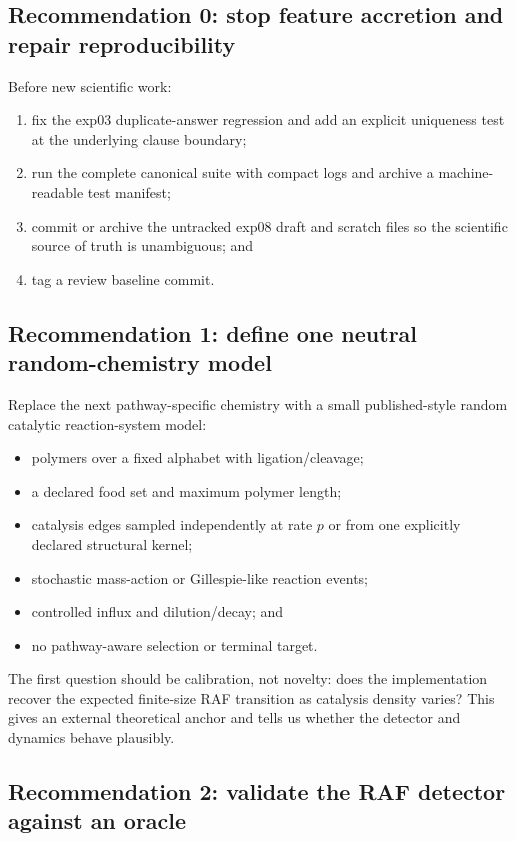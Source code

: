 \documentclass[11pt]{article}
\begin{document}
\subsection{Recommendation 0: stop feature accretion and repair reproducibility}

Before new scientific work:

\begin{enumerate}
\item fix the exp03 duplicate-answer regression and add an explicit uniqueness
      test at the underlying clause boundary;
\item run the complete canonical suite with compact logs and archive a
      machine-readable test manifest;
\item commit or archive the untracked exp08 draft and scratch files so the
      scientific source of truth is unambiguous; and
\item tag a review baseline commit.
\end{enumerate}

\subsection{Recommendation 1: define one neutral random-chemistry model}

Replace the next pathway-specific chemistry with a small published-style random
catalytic reaction-system model:

\begin{itemize}
\item polymers over a fixed alphabet with ligation/cleavage;
\item a declared food set and maximum polymer length;
\item catalysis edges sampled independently at rate $p$ or from one explicitly
  declared structural kernel;
\item stochastic mass-action or Gillespie-like reaction events;
\item controlled influx and dilution/decay; and
\item no pathway-aware selection or terminal target.
\end{itemize}

The first question should be calibration, not novelty: does the implementation
recover the expected finite-size RAF transition as catalysis density varies?
This gives an external theoretical anchor and tells us whether the detector and
dynamics behave plausibly.

\subsection{Recommendation 2: validate the RAF detector against an oracle}
\end{document}
